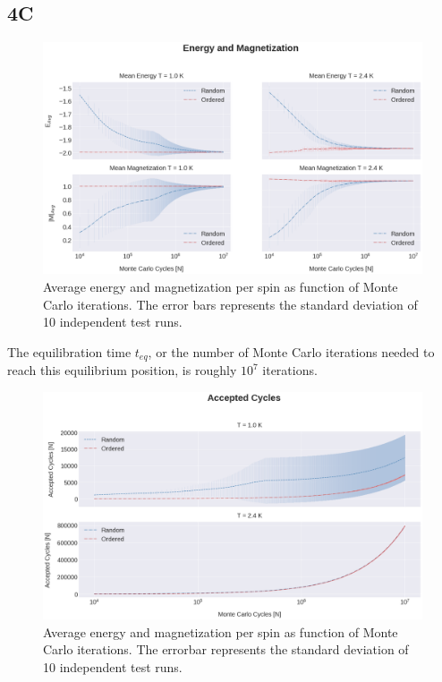 \documentclass[%
reprint,nofootinbib,
amsmath,amssymb,
aps,
]{revtex4-1}
\begin{document}
\subsection{4C}
\onecolumngrid
\begin{figure} 
	\includegraphics[width = \textwidth]{Figures/4C1.png} 
	\caption{\centering \label{4C11}Average energy and magnetization per spin as function of Monte Carlo iterations. The error bars represents the standard deviation of 10 independent test runs. \vspace{13mm}}
\end{figure}
\twocolumngrid
\newpage
The equilibration time $t_{eq}$, or the number of Monte Carlo iterations needed to reach this equilibrium position, is roughly $10^7$ iterations.  


\begin{figure} 
	\includegraphics[width = \textwidth]{Figures/Plot2.png} 
	\caption{\centering \label{4C1}Average energy and magnetization per spin as function of Monte Carlo iterations. The errorbar represents the standard deviation of 10 independent test runs.}
\end{figure}
\end{document}
